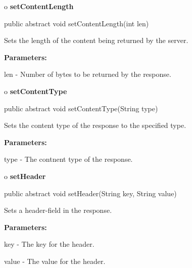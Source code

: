 o {\bf setContentLength} 

\begin{PRE}
 public abstract void setContentLength(int len)
\end{PRE}

\begin{description}
\htmlDD Sets the length of the content being returned by the server. 

\begin{description}
\item {\bf Parameters:}  

len - Number of bytes to be returned by the response.  
\end{description}

\end{description}

o {\bf setContentType} 

\begin{PRE}
 public abstract void setContentType(String type)
\end{PRE}

\begin{description}
\htmlDD Sets the content type of the response to the specified type. 

\begin{description}
\item {\bf Parameters:}  

type - The contnent type of the response.  
\end{description}

\end{description}

o {\bf setHeader} 

\begin{PRE}
 public abstract void setHeader(String key,
                                String value)
\end{PRE}

\begin{description}
\htmlDD Sets a header-field in the response. 

\begin{description}
\item {\bf Parameters:}  

key - The key for the header.  

value - The value for the header.  
\end{description}

\end{description}

